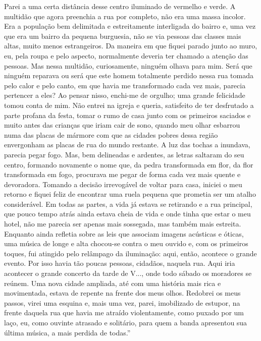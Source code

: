 Parei a uma certa distância desse centro iluminado de vermelho e verde.
A multidão que agora preenchia a rua por completo, não era uma massa
incolor. Era a população bem delimitada e estreitamente interligada do
bairro e, uma vez que era um bairro da pequena burguesia, não se via
pessoas das classes mais altas, muito menos estrangeiros. Da maneira em
que fiquei parado junto ao muro, eu, pela roupa e pelo aspecto,
normalmente deveria ter chamado a atenção das pessoas. Mas nessa
multidão, curiosamente, ninguém olhava para mim. Será que ninguém
reparava ou será que este homem totalmente perdido nessa rua tomada pelo
calor e pelo canto, em que havia me transformado cada vez mais, parecia
pertencer a eles? Ao pensar nisso, enchi-me de orgulho; uma grande
felicidade tomou conta de mim. Não entrei na igreja e queria, satisfeito
de ter desfrutado a parte profana da festa, tomar o rumo de casa junto
com os primeiros saciados e muito antes das crianças que iriam cair de
sono, quando meu olhar esbarrou numa das placas de mármore com que as
cidades pobres dessa região envergonham as placas de rua do mundo
restante. A luz das tochas a inundava, parecia pegar fogo. Mas, bem
delineadas e ardentes, as letras saltaram do seu centro, formando
novamente o nome que, da pedra transformada em flor, da flor
transformada em fogo, procurava me pegar de forma cada vez mais quente e
devoradora. Tomando a decisão irrevogável de voltar para casa, iniciei o
meu retorno e fiquei feliz de encontrar uma ruela pequena que prometia
ser um atalho considerável. Em todas as partes, a vida já estava se
retirando e a rua principal, que pouco tempo atrás ainda estava cheia de
vida e onde tinha que estar o meu hotel, não me parecia ser apenas mais
sossegada, mas também mais estreita. Enquanto ainda refletia sobre as
leis que associam imagens acústicas e óticas, uma música de longe e alta
chocou-se contra o meu ouvido e, com os primeiros toques, fui atingido
pelo relâmpago da iluminação: aqui, então, acontece o grande evento. Por
isso havia tão poucas pessoas, cidadãos, naquela rua. Aqui iria
acontecer o grande concerto da tarde de V..., onde todo sábado os
moradores se reúnem. Uma nova cidade ampliada, até com uma história mais
rica e movimentada, estava de repente na frente dos meus olhos. Redobrei
os meus passos, virei uma esquina e, mais uma vez, parei, imobilizado de
estupor, na frente daquela rua que havia me atraído violentamente, como
puxado por um laço, eu, como ouvinte atrasado e solitário, para quem a
banda apresentou sua última música, a mais perdida de todas.''

